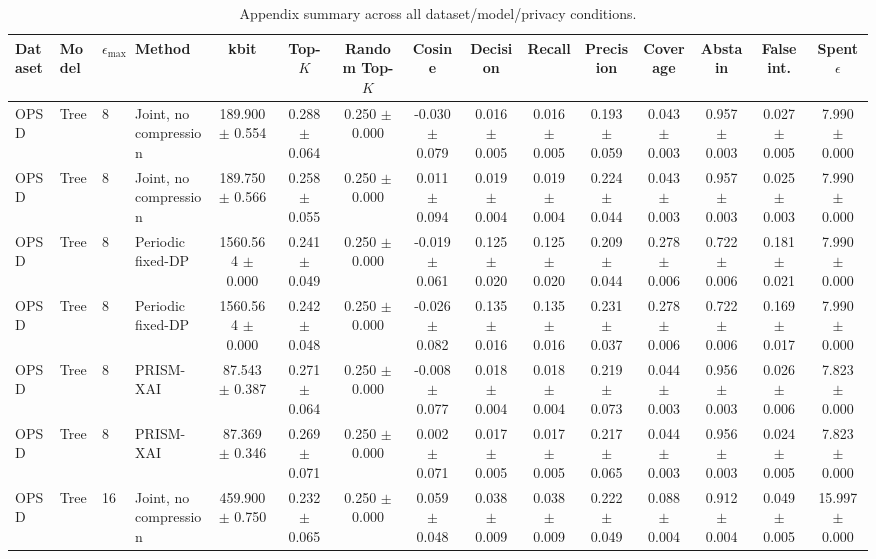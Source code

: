 \begin{table}[t]
\caption{Appendix summary across all dataset/model/privacy conditions.}
\label{tab:appendix-conditions}
\centering
\scriptsize
\setlength{\tabcolsep}{2.5pt}
\begin{tabular}{llllccccccccccc}
\toprule
Dataset & Model & $\epsilon_{\max}$ & Method & kbit & Top-$K$ & Random Top-$K$ & Cosine & Decision & Recall & Precision & Coverage & Abstain & False int. & Spent $\epsilon$ \\
\midrule
OPSD & Tree & 8 & Joint, no compression & 189.900 $\pm$ 0.554 & 0.288 $\pm$ 0.064 & 0.250 $\pm$ 0.000 & -0.030 $\pm$ 0.079 & 0.016 $\pm$ 0.005 & 0.016 $\pm$ 0.005 & 0.193 $\pm$ 0.059 & 0.043 $\pm$ 0.003 & 0.957 $\pm$ 0.003 & 0.027 $\pm$ 0.005 & 7.990 $\pm$ 0.000 \\
OPSD & Tree & 8 & Joint, no compression & 189.750 $\pm$ 0.566 & 0.258 $\pm$ 0.055 & 0.250 $\pm$ 0.000 & 0.011 $\pm$ 0.094 & 0.019 $\pm$ 0.004 & 0.019 $\pm$ 0.004 & 0.224 $\pm$ 0.044 & 0.043 $\pm$ 0.003 & 0.957 $\pm$ 0.003 & 0.025 $\pm$ 0.003 & 7.990 $\pm$ 0.000 \\
OPSD & Tree & 8 & Periodic fixed-DP & 1560.564 $\pm$ 0.000 & 0.241 $\pm$ 0.049 & 0.250 $\pm$ 0.000 & -0.019 $\pm$ 0.061 & 0.125 $\pm$ 0.020 & 0.125 $\pm$ 0.020 & 0.209 $\pm$ 0.044 & 0.278 $\pm$ 0.006 & 0.722 $\pm$ 0.006 & 0.181 $\pm$ 0.021 & 7.990 $\pm$ 0.000 \\
OPSD & Tree & 8 & Periodic fixed-DP & 1560.564 $\pm$ 0.000 & 0.242 $\pm$ 0.048 & 0.250 $\pm$ 0.000 & -0.026 $\pm$ 0.082 & 0.135 $\pm$ 0.016 & 0.135 $\pm$ 0.016 & 0.231 $\pm$ 0.037 & 0.278 $\pm$ 0.006 & 0.722 $\pm$ 0.006 & 0.169 $\pm$ 0.017 & 7.990 $\pm$ 0.000 \\
OPSD & Tree & 8 & PRISM-XAI & 87.543 $\pm$ 0.387 & 0.271 $\pm$ 0.064 & 0.250 $\pm$ 0.000 & -0.008 $\pm$ 0.077 & 0.018 $\pm$ 0.004 & 0.018 $\pm$ 0.004 & 0.219 $\pm$ 0.073 & 0.044 $\pm$ 0.003 & 0.956 $\pm$ 0.003 & 0.026 $\pm$ 0.006 & 7.823 $\pm$ 0.000 \\
OPSD & Tree & 8 & PRISM-XAI & 87.369 $\pm$ 0.346 & 0.269 $\pm$ 0.071 & 0.250 $\pm$ 0.000 & 0.002 $\pm$ 0.071 & 0.017 $\pm$ 0.005 & 0.017 $\pm$ 0.005 & 0.217 $\pm$ 0.065 & 0.044 $\pm$ 0.003 & 0.956 $\pm$ 0.003 & 0.024 $\pm$ 0.005 & 7.823 $\pm$ 0.000 \\
OPSD & Tree & 16 & Joint, no compression & 459.900 $\pm$ 0.750 & 0.232 $\pm$ 0.065 & 0.250 $\pm$ 0.000 & 0.059 $\pm$ 0.048 & 0.038 $\pm$ 0.009 & 0.038 $\pm$ 0.009 & 0.222 $\pm$ 0.049 & 0.088 $\pm$ 0.004 & 0.912 $\pm$ 0.004 & 0.049 $\pm$ 0.005 & 15.997 $\pm$ 0.000 \\

\end{tabular}
\end{table}
